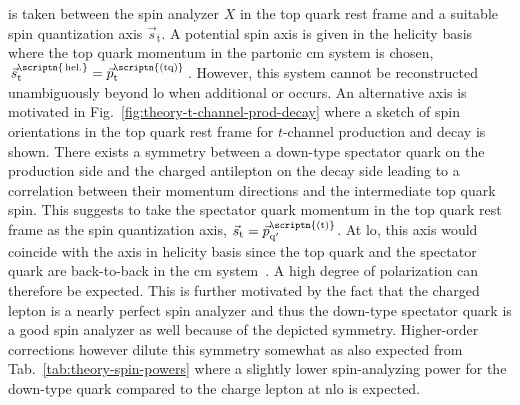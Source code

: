 is taken between the spin analyzer $X$ in the top quark rest frame and a suitable spin quantization axis $\vec{s}_\mathrm{t}$. A potential spin axis is given in the helicity basis where the top quark momentum in the partonic \acrlong{cm} system is chosen, $\vec{s}_\mathrm{t}^\scriptn{\,\mathrm{hel.}}=\vec{p}_\mathrm{t}^\scriptn{\mathrm{(tq)}}$. However, this system cannot be reconstructed unambiguously beyond \gls{lo} when additional  or  occurs. An alternative axis is motivated in Fig.~\ref{fig:theory-t-channel-prod-decay} where a sketch of spin orientations in the top quark rest frame for $t$-channel production and decay is shown. There exists a symmetry between a down-type spectator quark on the production side and the charged antilepton on the decay side leading to a correlation between their momentum directions and the intermediate top quark spin. This suggests to take the spectator quark momentum in the top quark rest frame as the spin quantization axis, $\vec{s}_\mathrm{t}=\vec{p}_{\mathrm{q}^\prime}^\scriptn{\mathrm{(t)}}$. At \gls{lo}, this axis would coincide with the axis in helicity basis since the top quark and the spectator quark are back-to-back in the \acrlong{cm} system~\cite{Schwienhorst:2010je}. A high degree of polarization can therefore be expected. This is further motivated by the fact that the charged lepton is a nearly perfect spin analyzer and thus the down-type spectator quark is a good spin analyzer as well because of the depicted symmetry. Higher-order corrections however dilute this symmetry somewhat as also expected from Tab.~\ref{tab:theory-spin-powers} where a slightly lower spin-analyzing power for the down-type quark compared to the charge lepton at \gls{nlo} is expected. 



